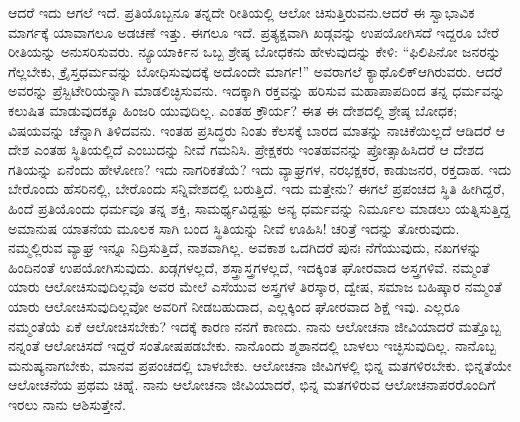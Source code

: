 ಆದರೆ ಇದು ಆಗಲೆ ಇದೆ. ಪ್ರತಿಯೊಬ್ಬನೂ ತನ್ನದೇ ರೀತಿಯಲ್ಲಿ ಆಲೋ ಚಿಸುತ್ತಿರುವನು.ಆದರೆ ಈ ಸ್ವಾಭಾವಿಕ ಮಾರ್ಗಕ್ಕೆ ಯಾವಾಗಲೂ ಅಡಚಣೆ ಇತ್ತು. ಈಗಲೂ ಇದೆ. ಪ್ರತ್ಯಕ್ಷವಾಗಿ ಖಡ್ಗವನ್ನು ಉಪಯೋಗಿಸದೆ ಇದ್ದರೂ ಬೇರೆ ರೀತಿಯನ್ನು ಅನುಸರಿಸುವರು. ನ್ಯೂಯಾರ್ಕಿನ ಒಬ್ಬ ಶ್ರೇಷ್ಠ ಬೋಧಕನು ಹೇಳುವುದನ್ನು ಕೇಳಿ: “ಫಿಲಿಪಿನೋ ಜನರನ್ನು ಗೆಲ್ಲಬೇಕು, ಕ್ರೈಸ್ತಧರ್ಮವನ್ನು ಬೋಧಿಸುವುದಕ್ಕೆ ಅದೊಂದೇ ಮಾರ್ಗ!” ಅವರಾಗಲೆ ಕ್ಯಾಥೊಲಿಕ್​ ಆಗಿರುವರು. ಆದರೆ ಅವರನ್ನು ಪ್ರೆಸ್ಬಿಟೇರಿಯನ್ನಾಗಿ ಮಾಡಲಿಚ್ಛಿಸುವನು. ಇದಕ್ಕಾಗಿ ರಕ್ತವನ್ನು ಹರಿಸುವ ಮಹಾಪಾಪದಿಂದ ತನ್ನ ಧರ್ಮವನ್ನು ಕಲುಷಿತ ಮಾಡುವುದಕ್ಕೂ ಹಿಂಜರಿ ಯುವುದಿಲ್ಲ. ಎಂತಹ ಕ್ರೌರ್ಯ? ಈತ ಈ ದೇಶದಲ್ಲಿ ಶ್ರೇಷ್ಠ ಬೋಧಕ; ವಿಷಯವನ್ನು ಚೆನ್ನಾಗಿ ತಿಳಿದವನು. ಇಂತಹ ಪ್ರಸಿದ್ಧರು ನಿಂತು ಕೆಲಸಕ್ಕೆ ಬಾರದ ಮಾತನ್ನು ನಾಚಿಕೆಯಿಲ್ಲದೆ ಆಡಿದರೆ ಆ ದೇಶ ಎಂತಹ ಸ್ಥಿತಿಯಲ್ಲಿದೆ ಎಂಬುದನ್ನು ನೀವೆ ಗಮನಿಸಿ. ಪ್ರೇಕ್ಷಕರು ಇಂತಹವನನ್ನು ಪ್ರೋತ್ಸಾಹಿಸಿದರೆ ಆ ದೇಶದ ಗತಿಯನ್ನು ಏನೆಂದು ಹೇಳೋಣ? ಇದು ನಾಗರಿಕತೆಯೆ? ಇದು ವ್ಯಾಘ್ರಗಳ, ನರಭಕ್ಷಕರ, ಕಾಡುಜನರ, ರಕ್ತದಾಹ. ಇದು ಬೇರೊಂದು ಹೆಸರಿನಲ್ಲಿ, ಬೇರೊಂದು ಸನ್ನಿವೇಶದಲ್ಲಿ ಬರುತ್ತಿದೆ. ಇದು ಮತ್ತೇನು? ಈಗಲೆ ಪ್ರಪಂಚದ ಸ್ಥಿತಿ ಹೀಗಿದ್ದರೆ, ಹಿಂದೆ ಪ್ರತಿಯೊಂದು ಧರ್ಮವೂ ತನ್ನ ಶಕ್ತಿ, ಸಾಮರ್ಥ್ಯವಿದ್ದಷ್ಟು ಅನ್ಯ ಧರ್ಮವನ್ನು ನಿರ್ಮೂಲ ಮಾಡಲು ಯತ್ನಿಸುತ್ತಿದ್ದ ಅಮಾನುಷ ಯಾತನೆಯ ಮೂಲಕ ಸಾಗಿ ಬಂದ ಸ್ಥಿತಿಯನ್ನು ನೀವೆ ಊಹಿಸಿ! ಚರಿತ್ರೆ ಇದನ್ನು ತೋರುವುದು. ನಮ್ಮಲ್ಲಿರುವ ವ್ಯಾಘ್ರ ಇನ್ನೂ ನಿದ್ರಿಸುತ್ತಿದೆ, ನಾಶವಾಗಿಲ್ಲ. ಅವಕಾಶ ಒದಗಿದರೆ ಪುನಃ ನೆಗೆಯುವುದು, ನಖಗಳನ್ನು ಹಿಂದಿನಂತೆ ಉಪಯೋಗಿಸುವುದು. ಖಡ್ಗಗಳಲ್ಲದೆ, ಶಸ್ತ್ರಾಸ್ತ್ರಗಳಲ್ಲದೆ, ಇದಕ್ಕಿಂತ ಘೋರವಾದ ಅಸ್ತ್ರಗಳಿವೆ. ನಮ್ಮಂತೆ ಯಾರು ಆಲೋಚಿಸುವುದಿಲ್ಲವೊ ಅವರ ಮೇಲೆ ಎಸೆಯುವ ಅಸ್ತ್ರಗಳೆ ತಿರಸ್ಕಾರ, ದ್ವೇಷ, ಸಮಾಜ ಬಹಿಷ್ಕಾರ ನಮ್ಮಂತೆ ಯಾರು ಆಲೋಚಿಸುವುದಿಲ್ಲವೋ ಅವರಿಗೆ ನೀಡಬಹುದಾದ, ಎಲ್ಲಕ್ಕಿಂದ ಘೋರವಾದ ಶಿಕ್ಷೆ ಇವು. ಎಲ್ಲರೂ ನಮ್ಮಂತೆಯೆ ಏಕೆ ಆಲೋಚಿಸಬೇಕು? ಇದಕ್ಕೆ ಕಾರಣ ನನಗೆ ಕಾಣದು. ನಾನು ಆಲೋಚನಾ ಜೀವಿಯಾದರೆ ಮತ್ತೊಬ್ಬ ನನ್ನಂತೆ ಆಲೋಚಿಸದೆ ಇದ್ದರೆ ಸಂತೋಷಪಡಬೇಕು. ನಾನೊಂದು ಶ್ಮಶಾನದಲ್ಲಿ ಬಾಳಲು ಇಚ್ಛಿಸುವುದಿಲ್ಲ. ನಾನೊಬ್ಬ ಮನುಷ್ಯನಾಗಬೇಕು, ಮಾನವ ಪ್ರಪಂಚದಲ್ಲಿ ಬಾಳಬೇಕು. ಆಲೋಚನಾ ಜೀವಿಗಳಲ್ಲಿ ಭಿನ್ನ ಮತಗಳಿರಬೇಕು. ಭಿನ್ನತೆಯೇ ಆಲೋಚನೆಯ ಪ್ರಥಮ ಚಿಹ್ನೆ. ನಾನು ಆಲೋಚನಾ ಜೀವಿಯಾದರೆ, ಭಿನ್ನ ಮತಗಳಿರುವ ಆಲೋಚನಾಪರರೊಂದಿಗೆ ಇರಲು ನಾನು ಆಶಿಸುತ್ತೇನೆ.

